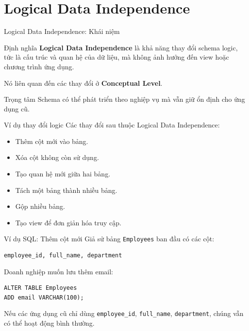 \documentclass[aspectratio=169,11pt]{beamer}
\begin{document}
\section{Logical Data Independence}

\begin{frame}{Logical Data Independence: Khái niệm}
\begin{block}{Định nghĩa}
\textbf{Logical Data Independence} là khả năng thay đổi schema logic, tức là cấu trúc và quan hệ của dữ liệu, mà không ảnh hưởng đến view hoặc chương trình ứng dụng.
\end{block}

\vspace{0.3cm}
Nó liên quan đến các thay đổi ở \textbf{Conceptual Level}.

\vspace{0.3cm}
\begin{alertblock}{Trọng tâm}
Schema có thể phát triển theo nghiệp vụ mà vẫn giữ ổn định cho ứng dụng cũ.
\end{alertblock}
\end{frame}

\begin{frame}{Ví dụ thay đổi logic}
Các thay đổi sau thuộc Logical Data Independence:
\begin{itemize}
  \item Thêm cột mới vào bảng.
  \item Xóa cột không còn sử dụng.
  \item Tạo quan hệ mới giữa hai bảng.
  \item Tách một bảng thành nhiều bảng.
  \item Gộp nhiều bảng.
  \item Tạo view để đơn giản hóa truy cập.
\end{itemize}
\end{frame}

\begin{frame}[fragile]{Ví dụ SQL: Thêm cột mới}
Giả sử bảng \texttt{Employees} ban đầu có các cột:

\begin{lstlisting}[style=sqlstyle]
employee_id, full_name, department
\end{lstlisting}

Doanh nghiệp muốn lưu thêm email:

\begin{lstlisting}[style=sqlstyle]
ALTER TABLE Employees
ADD email VARCHAR(100);
\end{lstlisting}

Nếu các ứng dụng cũ chỉ dùng \texttt{employee\_id}, \texttt{full\_name}, \texttt{department}, chúng vẫn có thể hoạt động bình thường.
\end{frame}
\end{document}
